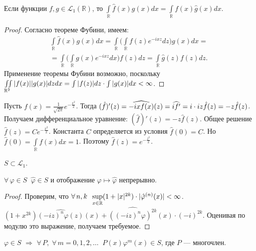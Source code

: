 \documentclass[12pt,titlepage, a4paper]{article}
\begin{document}
\begin{theorem}
Если функции $f,g\in \mathcal{L}_1(\mathbb{R})$, то
$\int\limits_\mathbb{R}\hat
f(x)g(x)dx=\int\limits_\mathbb{R}f(x)\hat g(x)dx$.
\end{theorem}

\begin{proof}
Согласно теореме Фубини, имеем:
\begin{multline*}
\int\limits_\mathbb{R}\hat f(x)g(x)dx=
\int\limits_\mathbb{R}\Big(\int\limits_\mathbb{R}f(z)e^{-ixz}dz\Big)g(x)dx=\\=
\int\limits_\mathbb{R}\Big(\int\limits_\mathbb{R}g(x)e^{-ixz}dx\Big)f(z)dz=
\int\limits_\mathbb{R}\hat g(z)f(z)dz.
\end{multline*}
Применение теоремы Фубини возможно, поскольку
$\iint\limits_{\mathbb{R}^2}|f(x)||g(x)|dzdx\p=\int
|f(z)|dz\cdot\int |g(x)|dx <\infty$.
\end{proof}

\prim

Пусть $f(x)=\frac{1}{\sqrt{2\pi}}e^{-\frac{x^2}{2}}$. Тогда $(\hat
f)'(z)=\widehat {-ixf(x)}(z)=\widehat {if'}=i\cdot iz\hat
f(z)\p=-z\hat f(z)$. Получаем дифференциальное уравнение: $(\hat
f)'(z)=-z\hat f(z)$. Общее решение $\hat f(z)=Ce^{-\frac{x^2}{2}}$.
Константа $C$ определяется из условия $\hat f(0)=C$. Но $\hat
f(0)=\int\limits_{\mathbb{R}}f(x)dx=1$. Поэтому $\hat
f(z)=e^{-\frac{z^2}{2}}$.

\begin{zam}
$S\subset \mathcal{L}_1$.
\end{zam}

\begin{theorem}
$\forall\,\varphi\in S\;\; \hat \varphi\in S$ и отображение $\varphi
\mapsto \hat \varphi$ непрерывно.
\end{theorem}

\begin{proof}
Проверим, что $\forall\, n,k\;\; \sup\limits_{x\in\mathbb{R}}
(1\p+|x|^{2k})\cdot |\hat {\varphi}^{(n)}(x)|<\infty$.
$(1+x^{2k})\widehat {(-iz)^n\varphi(z)}(x)+\widehat
{((-iz)^n\varphi)^{2k}}(x)\cdot (-i)^{2k}$. Оценивая по модулю это
выражение, получаем требуемое.%
\end{proof}

\begin{theorem}
$\varphi\in S$ $\Rightarrow$ $\forall\, P,\; \forall\,
m=0,1,2,\ldots\;\; P(x)\varphi^m(x)\in S$, где $P$ --- многочлен.
\end{theorem}
\end{document}
